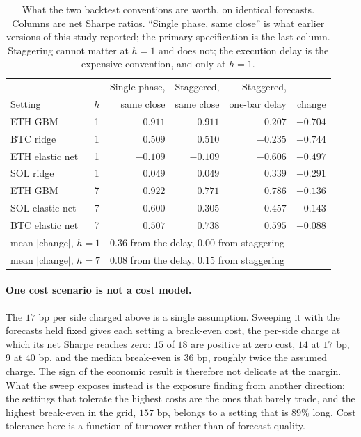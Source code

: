 \documentclass{article}
\theoremstyle{plain}
\theoremstyle{definition}
\begin{document}
\begin{table}[t]
  \centering
  \caption{What the two backtest conventions are worth, on identical forecasts. Columns are
  net Sharpe ratios. ``Single phase, same close'' is what earlier versions of this study
  reported; the primary specification is the last column. Staggering cannot matter at $h=1$
  and does not; the execution delay is the expensive convention, and only at $h=1$.}
  \label{tab:execution}
  \small
  \begin{tabular}{lcrrrr}
    \toprule
    & & Single phase, & Staggered, & Staggered, & \\
    Setting & $h$ & same close & same close & one-bar delay & change \\
    \midrule
    ETH GBM         & 1 & $0.911$ & $0.911$ & $0.207$ & $-0.704$ \\
    BTC ridge       & 1 & $0.509$ & $0.510$ & $-0.235$ & $-0.744$ \\
    ETH elastic net & 1 & $-0.109$ & $-0.109$ & $-0.606$ & $-0.497$ \\
    SOL ridge       & 1 & $0.049$ & $0.049$ & $0.339$ & $+0.291$ \\
    \midrule
    ETH GBM         & 7 & $0.922$ & $0.771$ & $0.786$ & $-0.136$ \\
    SOL elastic net & 7 & $0.600$ & $0.305$ & $0.457$ & $-0.143$ \\
    BTC elastic net & 7 & $0.507$ & $0.738$ & $0.595$ & $+0.088$ \\
    \midrule
    \multicolumn{2}{l}{mean $|$change$|$, $h=1$} & \multicolumn{4}{l}{$0.36$ from the delay, $0.00$ from staggering} \\
    \multicolumn{2}{l}{mean $|$change$|$, $h=7$} & \multicolumn{4}{l}{$0.08$ from the delay, $0.15$ from staggering} \\
    \bottomrule
  \end{tabular}
\end{table}

\paragraph{One cost scenario is not a cost model.} The $17$ bp per side charged above is a
single assumption. Sweeping it with the forecasts held fixed gives each setting a break-even
cost, the per-side charge at which its net Sharpe reaches zero: $15$ of $18$ are positive at
zero cost, $14$ at $17$ bp, $9$ at $40$ bp, and the median break-even is $36$ bp, roughly
twice the assumed charge. The sign of the economic result is therefore not delicate at the
margin. What the sweep exposes instead is the exposure finding from another direction: the
settings that tolerate the highest costs are the ones that barely trade, and the highest
break-even in the grid, $157$ bp, belongs to a setting that is $89\%$ long. Cost tolerance
here is a function of turnover rather than of forecast quality.
\end{document}
